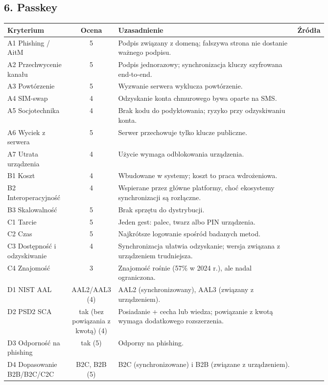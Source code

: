 \subsection*{6. Passkey}
\begingroup\small
\begin{longtable}{@{}p{0.2\linewidth}c p{0.56\linewidth}l@{}}
\toprule
Kryterium & Ocena & Uzasadnienie & Źródła \\
\midrule
\endhead
A1 Phishing / AitM & 5 & Podpis związany z domeną; fałszywa strona nie dostanie ważnego podpisu. & \cite{S1,P6,A1} \\
A2 Przechwycenie kanału & 5 & Podpis jednorazowy; synchronizacja kluczy szyfrowana end-to-end. & \cite{S1,P5} \\
A3 Powtórzenie & 5 & Wyzwanie serwera wyklucza powtórzenie. & \cite{S1} \\
A4 SIM-swap & 4 & Odzyskanie konta chmurowego bywa oparte na SMS. & \cite{P5,P11} \\
A5 Socjotechnika & 4 & Brak kodu do podyktowania; ryzyko przy odzyskiwaniu konta. & \cite{P4,P11} \\
A6 Wyciek z serwera & 5 & Serwer przechowuje tylko klucze publiczne. & \cite{S1,P6} \\
A7 Utrata urządzenia & 4 & Użycie wymaga odblokowania urządzenia. & \cite{S1,P5} \\
B1 Koszt & 4 & Wbudowane w systemy; koszt to praca wdrożeniowa. & \cite{P4,R2} \\
B2 Interoperacyjność & 4 & Wspierane przez główne platformy, choć ekosystemy synchronizacji są rozłączne. & \cite{P4,P5,W4} \\
B3 Skalowalność & 5 & Brak sprzętu do dystrybucji. & \cite{R2,P4} \\
C1 Tarcie & 5 & Jeden gest: palec, twarz albo PIN urządzenia. & \cite{P4,P1} \\
C2 Czas & 5 & Najkrótsze logowanie spośród badanych metod. & \cite{P4,R2} \\
C3 Dostępność i odzyskiwanie & 4 & Synchronizacja ułatwia odzyskanie; wersja związana z urządzeniem trudniejsza. & \cite{P5} \\
C4 Znajomość & 3 & Znajomość rośnie (57\% w 2024 r.), ale nadal ograniczona. & \cite{R1,R2} \\
D1 NIST AAL & AAL2/AAL3 (4) & AAL2 (synchronizowany), AAL3 (związany z urządzeniem). & \cite{N1} \\
D2 PSD2 SCA & tak (bez powiązania z kwotą) (4) & Posiadanie + cecha lub wiedza; powiązanie z kwotą wymaga dodatkowego rozszerzenia. & \cite{N3,S1} \\
D3 Odporność na phishing & tak (5) & Odporny na phishing. & \cite{N1,P6} \\
D4 Dopasowanie B2B/B2C/C2C & B2C, B2B (5) & B2C (synchronizowane) i B2B (związane z urządzeniem). & \cite{R2,P5} \\
\bottomrule
\end{longtable}
\endgroup

